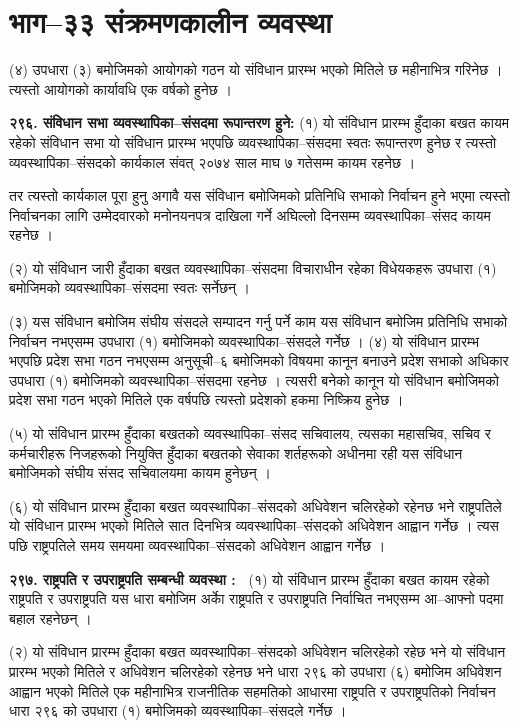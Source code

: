\section{भाग–३३ संक्रमणकालीन व्यवस्था}

(४) उपधारा (३) बमोजिमको आयोगको गठन यो संविधान प्रारम्भ भएको मितिले छ महीनाभित्र गरिनेछ । त्यस्तो आयोगको कार्यावधि एक वर्षको हुनेछ ।

\textbf{२९६. संविधान सभा व्यवस्थापिका–संसदमा रूपान्तरण हुने:} (१) यो संविधान प्रारम्भ हुँदाका बखत कायम रहेको संविधान सभा यो संविधान प्रारम्भ भएपछि व्यवस्थापिका–संसदमा स्वतः रूपान्तरण हुनेछ र त्यस्तो व्यवस्थापिका–संसदको कार्यकाल संवत् २०७४ साल माघ ७ गतेसम्म कायम रहनेछ ।

तर त्यस्तो कार्यकाल पूरा हुनु अगावै यस संविधान बमोजिमको प्रतिनिधि सभाको निर्वाचन हुने भएमा त्यस्तो निर्वाचनका लागि उम्मेदवारको मनोनयनपत्र दाखिला गर्ने अघिल्लो दिनसम्म व्यवस्थापिका–संसद कायम रहनेछ ।

(२) यो संविधान जारी हुँदाका बखत व्यवस्थापिका–संसदमा विचाराधीन रहेका विधेयकहरू उपधारा (१) बमोजिमको व्यवस्थापिका–संसदमा स्वतः सर्नेछन् ।

(३) यस संविधान बमोजिम संघीय संसदले सम्पादन गर्नु पर्ने काम यस संविधान बमोजिम प्रतिनिधि सभाको निर्वाचन नभएसम्म उपधारा (१) बमोजिमको व्यवस्थापिका–संसदले गर्नेछ ।
(४) यो संविधान प्रारम्भ भएपछि प्रदेश सभा गठन नभएसम्म अनुसूची–६ बमोजिमको विषयमा कानून बनाउने प्रदेश सभाको अधिकार उपधारा (१) बमोजिमको व्यवस्थापिका–संसदमा रहनेछ । त्यसरी बनेको कानून यो संविधान बमोजिमको प्रदेश सभा गठन भएको मितिले एक वर्षपछि त्यस्तो प्रदेशको हकमा निष्क्रिय हुनेछ ।

(५) यो संविधान प्रारम्भ हुँदाका बखतको व्यवस्थापिका–संसद सचिवालय, त्यसका महासचिव, सचिव र कर्मचारीहरू निजहरूको नियुक्ति हुँदाका बखतको सेवाका शर्तहरूको अधीनमा रही यस संविधान बमोजिमको संघीय संसद सचिवालयमा कायम हुनेछन् ।

(६) यो संविधान प्रारम्भ हुँदाका बखत व्यवस्थापिका–संसदको अधिवेशन चलिरहेको रहेनछ भने राष्ट्रपतिले यो संविधान प्रारम्भ भएको मितिले सात दिनभित्र व्यवस्थापिका–संसदको अधिवेशन आह्वान गर्नेछ । त्यस पछि राष्ट्रपतिले समय समयमा व्यवस्थापिका–संसदको अधिवेशन आह्वान गर्नेछ ।

\textbf{२९७. राष्ट्रपति र उपराष्ट्रपति सम्बन्धी व्यवस्था : } (१) यो संविधान प्रारम्भ हुँदाका बखत कायम रहेको राष्ट्रपति र उपराष्ट्रपति यस धारा बमोजिम अर्काे राष्ट्रपति र उपराष्ट्रपति निर्वाचित नभएसम्म आ–आफ्नो पदमा बहाल रहनेछन् ।

(२) यो संविधान प्रारम्भ हुँदाका बखत व्यवस्थापिका–संसदको अधिवेशन चलिरहेको रहेछ भने यो संविधान प्रारम्भ भएको मितिले र अधिवेशन चलिरहेको रहेनछ भने धारा २९६ को उपधारा (६) बमोजिम अधिवेशन आह्वान भएको मितिले एक महीनाभित्र राजनीतिक सहमतिको आधारमा राष्ट्रपति र उपराष्ट्रपतिको निर्वाचन धारा २९६ को उपधारा (१) बमोजिमको व्यवस्थापिका–संसदले गर्नेछ ।

